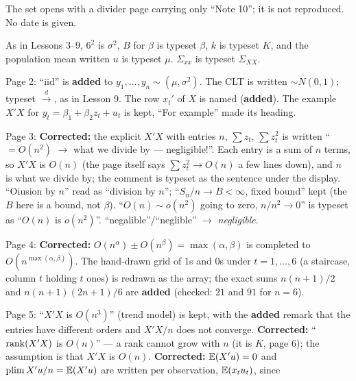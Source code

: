 \documentclass[11pt]{article}
\begin{document}
\begin{transcriptnotes}
  \item The set opens with a divider page carrying only ``Note 10''; it is not
        reproduced. No date is given.
  \item As in Lessons 3--9, $6^{2}$ is $\sigma^{2}$, $B$ for $\beta$ is typeset
        $\beta$, $k$ is typeset $K$, and the population mean written $u$ is
        typeset $\mu$. $\Sigma_{xx}$ is typeset $\Sigma_{XX}$.
  \item Page 2: ``iid'' is \textbf{added} to $y_{1}, \ldots, y_{n} \sim (\mu,
        \sigma^{2})$. The CLT is written $\sim N(0,1)$; typeset
        $\xrightarrow{d}$, as in Lesson 9. The row $x_{t}'$ of $X$ is named
        (\textbf{added}). The example $X'X$ for $y_{t} = \beta_{1} + \beta_{2}z_{t}
        + u_{t}$ is kept, ``For example'' made its heading.
  \item Page 3: \textbf{Corrected:} the explicit $X'X$ with entries $n$,
        $\sum z_{t}$, $\sum z_{t}^{2}$ is written ``$= O(n^{2})$ $\to$ what we
        divide by --- negligible!''. Each entry is a sum of $n$ terms, so $X'X$ is
        $O(n)$ (the page itself says $\sum z_{t}^{2} \to O(n)$ a few lines down),
        and $n$ is what we divide by; the comment is typeset as the sentence under
        the display. ``Oiusion by $n$'' read as ``division by $n$''; ``$S_{n}/n \to
        B < \infty$, fixed bound'' kept (the $B$ here is a bound, not $\beta$).
        ``$O(n) \sim o(n^{2})$ going to zero, $n/n^{2} \to 0$'' is typeset as
        ``$O(n)$ is $o(n^{2})$''. ``negalible''/``neglible'' $\to$
        \emph{negligible}.
  \item Page 4: \textbf{Corrected:} $O(n^{\alpha}) \pm O(n^{\beta}) =
        \max(\alpha, \beta)$ is completed to $O(n^{\max(\alpha,\beta)})$. The
        hand-drawn grid of 1s and 0s under $t = 1, \ldots, 6$ (a staircase, column
        $t$ holding $t$ ones) is redrawn as the array; the exact sums
        $n(n+1)/2$ and $n(n+1)(2n+1)/6$ are \textbf{added} (checked: $21$ and $91$
        for $n = 6$).
  \item Page 5: ``$X'X$ is $O(n^{3})$'' (trend model) is kept, with the
        \textbf{added} remark that the entries have different orders and $X'X/n$
        does not converge. \textbf{Corrected:} ``$\operatorname{rank}(X'X)$ is $O(n)$'' --- a
        rank cannot grow with $n$ (it is $K$, page 6); the assumption is that
        $X'X$ is $O(n)$. \textbf{Corrected:} $\mathbb{E}(X'u) = 0$ and $\operatorname*{plim}
        X'u/n = \mathbb{E}(X'u)$ are written per observation, $\mathbb{E}(x_{t}u_{t})$, since

\end{transcriptnotes}
\end{document}

